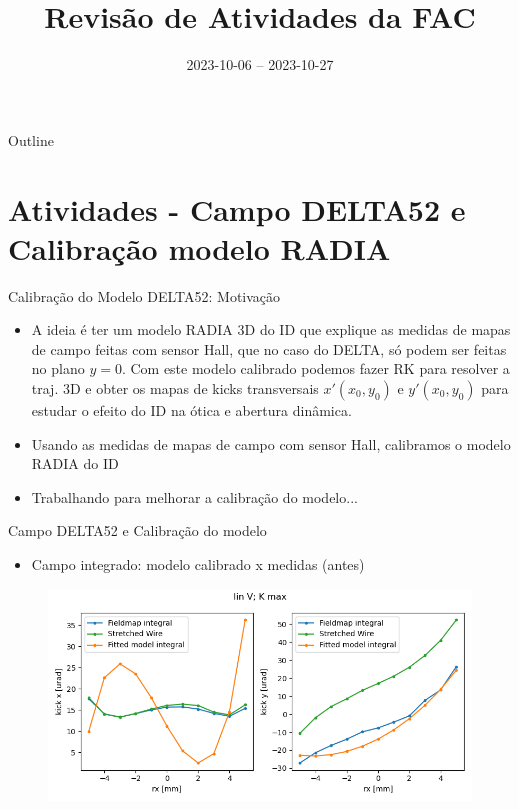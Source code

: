\documentclass{beamer}					  %
\title{Revisão de Atividades da FAC}	%
\institute{LNLS.DAC.FAC}				%
\date{2023-10-06 -- 2023-10-27}			%
\begin{document}
\begin{frame}
  \titlepage
  \href{https://github.com/lnls-fac/doc-review-dac-fac}{}
  \href{https://www.overleaf.com/read/sbdjxtzfchrm}{}
\end{frame}

\begin{frame}{Outline}
  \tableofcontents
\end{frame}


\section{Atividades - Campo DELTA52 e Calibração modelo RADIA}

\begin{frame}{Calibração do Modelo DELTA52: Motivação}
    \begin{itemize}
		\item A ideia é ter um modelo RADIA 3D do ID que explique as medidas de mapas de campo feitas com sensor Hall, que no caso do DELTA, só podem ser feitas no plano $y = 0$. Com este modelo calibrado podemos fazer RK para resolver a traj. 3D e obter os mapas de kicks transversais $x'(x_0, y_0)$ e $y'(x_0, y_0)$ para estudar o efeito do ID na ótica e abertura dinâmica.
        \item Usando as medidas de mapas de campo com sensor Hall, calibramos o modelo RADIA do ID
        \item Trabalhando para melhorar a calibração do modelo...
	\end{itemize}
\end{frame}

\begin{frame}{Campo DELTA52 e Calibração do modelo}
\begin{itemize}
        \item Campo integrado: modelo calibrado x medidas (antes)
	\end{itemize}
\begin{figure}[H]
		\centering
        \includegraphics[width=.9\textwidth]{2023-10-27/figures/field_integrals_fitting.png}
        \label{fig:integral_fitting}
    \end{figure}
\end{frame}
\end{document}
